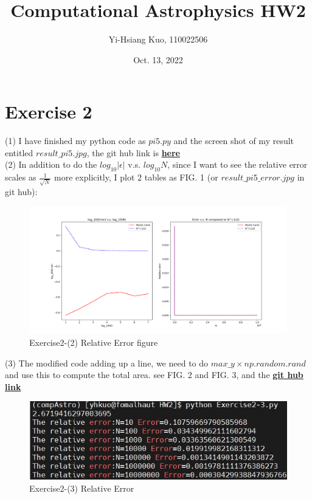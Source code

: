 \documentclass[aps,12pt,prd,nofootinbib,bibnotes, amsmath,amssymb,showpacs,superscriptaddress,floatfix]{revtex4-2}
\begin{document}
\title{Computational Astrophysics HW2}
\author{Yi-Hsiang Kuo, 110022506}
\date{Oct. 13, 2022}
\maketitle
\section{Exercise 2}
(1) I have finished my python code as $pi5.py$ and the screen shot of my result entitled  $result\_pi5.jpg$, the git hub link is \href{https://github.com/kuo1235/Computational-Astrophysics-2022/blob/main/astr660/Homework/HW2/pi5.py}{\bf{here}} \\ 
  
(2) In addition to do the $log_{10}|\epsilon|$ v.s. $log_{10}N$, since I want to see the relative error scales as $\frac{1}{\sqrt{N}}$ more explicitly, I plot 2 tables as FIG. 1 (or $result\_pi5\_error.jpg$ in git hub): \\

\begin{figure}
	\centering
	\includegraphics[width=1.0\textwidth]{result_pi5_error}
	\caption{Exercise2-(2) Relative Error figure}
\end{figure}

(3) The modified code adding up a line, we need to do $max\_y \times np.random.rand$ and use this to compute the total area. see FIG. 2 and FIG. 3, and the \href{https://github.com/kuo1235/Computational-Astrophysics-2022/blob/main/astr660/Homework/HW2/Exercise2-(3).py}{\bf{git hub link}}
 
\begin{figure}
	\centering
	\includegraphics[width=1.0\textwidth]{error_Exercise2-(3)}
	\caption{Exercise2-(3) Relative Error}
\end{figure}
\end{document}
